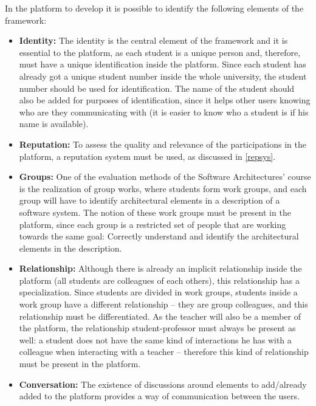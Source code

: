 In the platform to develop it is possible to identify the following elements of the framework:


\begin{itemize}
\item \textbf{Identity:} The identity is the central element of the framework and it is essential to the platform, as each student is a unique person and, therefore, must have a unique identification inside the platform. Since each student has already got a unique student number inside the whole university, the student number should be used for identification. The name of the student should also be added for purposes of identification, since it helps other users knowing who are they communicating with (it is easier to know who a student is if his name is available).

\item \textbf{Reputation:} To assess the quality and relevance of the participations in the platform, a reputation system must be used, as discussed in \ref{repsys}.

\item \textbf{Groups:} One of the evaluation methods of the Software Architectures' course is the realization of group works, where students form work groups, and each group will have to identify architectural elements in a description of a software system. The notion of these work groups must be present in the platform, since each group is a restricted set of people that are working towards the same goal: Correctly understand and identify the architectural elements in the description. 

\item \textbf{Relationship:} Although there is already an implicit relationship inside the platform (all students are colleagues of each others), this relationship has a specialization. Since students are divided in work groups, students inside a work group have a different relationship – they are group colleagues, and this relationship must be differentiated. As the teacher will also be a member of the platform, the relationship student-professor must always be present as well: a student does not have the same kind of interactions he has with a colleague when interacting with a teacher – therefore this kind of relationship must be present in the platform.

\item \textbf{Conversation:} The existence of discussions around elements to add/already added to the platform provides a way of communication between the users.


\end{itemize}
